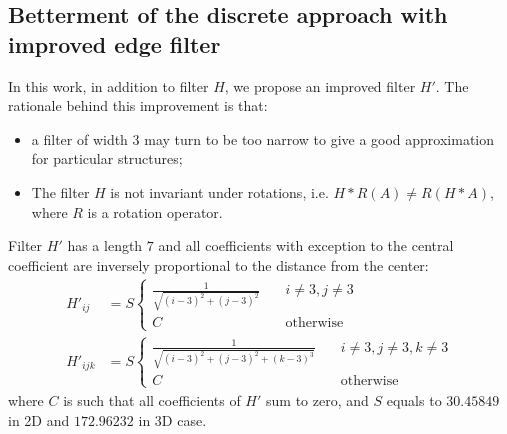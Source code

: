 \documentclass[preprint]{elsarticle}
\begin{document}
\subsection{Betterment of the discrete approach with improved edge filter}
In this work, in addition to filter $H$, we propose an improved filter $H'$. The
rationale behind this improvement is that:
\begin{itemize}
\item a filter of width 3 may turn to be too narrow to give a good approximation
  for particular structures;
\item The filter $H$ is not invariant under rotations, i.e.
  $H*R(A) \ne R(H*A)$, where $R$ is a rotation operator.
\end{itemize}
Filter $H'$ has a length $7$ and all coefficients with exception to the central
coefficient are inversely proportional to the distance from the center:
\begin{equation}
  \begin{aligned}
    H'_{ij} &= S \left\{
    \begin{array}{cc}
      \frac{1}{\sqrt{(i-3)^2 + (j-3)^2}} & \quad i \ne 3, j \ne 3 \\
      C & \quad \text{otherwise}
    \end{array}
    \right. \\
    H'_{ijk} &= S \left\{
    \begin{array}{cc}
      \frac{1}{\sqrt{(i-3)^2 + (j-3)^2 + (k-3)^3}} & \quad i \ne 3, j \ne 3, k
      \ne 3 \\
      C & \quad \text{otherwise}
    \end{array}
    \right.
  \end{aligned}
  \label{eq:filter-7x7}
\end{equation}
where $C$ is such that all coefficients of $H'$ sum to zero, and $S$ equals to
$30.45849$ in 2D and $172.96232$ in 3D case.
\end{document}
